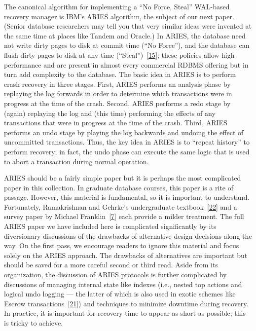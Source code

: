 \documentclass[b5paper,11pt,twoside,openright]{book}
\begin{document}
The canonical algorithm for implementing a ``No Force, Steal'' WAL-based
recovery manager is IBM's ARIES algorithm, the subject of our next
paper. (Senior database researchers may tell you that very similar ideas
were invented at the same time at places like Tandem and Oracle.) In
ARIES, the database need not write dirty pages to disk at commit time
(``No Force''), and the database can flush dirty pages to disk at any
time (``Steal'')~{{[}\protect\hyperlink{ref-haerder-reuter}{15}{]}};
these policies allow high performance and are present in almost every
commercial RDBMS offering but in turn add complexity to the database.
The basic idea in ARIES is to perform crash recovery in three stages.
First, ARIES performs an analysis phase by replaying the log forwards in
order to determine which transactions were in progress at the time of
the crash. Second, ARIES performs a redo stage by (again) replaying the
log and (this time) performing the effects of any transactions that were
in progress at the time of the crash. Third, ARIES performs an undo
stage by playing the log backwards and undoing the effect of uncommitted
transactions. Thus, the key idea in ARIES is to ``repeat history'' to
perform recovery; in fact, the undo phase can execute the same logic
that is used to abort a transaction during normal operation.

ARIES should be a fairly simple paper but it is perhaps the most
complicated paper in this collection. In graduate database courses, this
paper is a rite of passage. However, this material is fundamental, so it
is important to understand. Fortunately, Ramakrishnan and Gehrke's
undergraduate textbook~{{[}\protect\hyperlink{ref-cowbook}{22}{]}} and a
survey paper by Michael
Franklin~{{[}\protect\hyperlink{ref-franklin-aries}{7}{]}} each provide
a milder treatment. The full ARIES paper we have included here is
complicated significantly by its diversionary discussions of the
drawbacks of alternative design decisions along the way. On the first
pass, we encourage readers to ignore this material and focus solely on
the ARIES approach. The drawbacks of alternatives are important but
should be saved for a more careful second or third read. Aside from its
organization, the discussion of ARIES protocols is further complicated
by discussions of managing internal state like indexes (i.e., nested top
actions and logical undo logging --- the latter of which is also used in
exotic schemes like Escrow
transactions~{{[}\protect\hyperlink{ref-escrow}{21}{]}}) and techniques
to minimize downtime during recovery. In practice, it is important for
recovery time to appear as short as possible; this is tricky to achieve.
\end{document}
